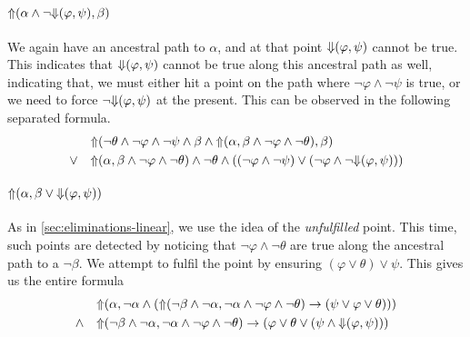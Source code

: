 \documentclass[a4paper,UKenglish,cleveref, autoref, thm-restate, numberwithinsect]{lipics-v2021}
\def\Uarrow{\ensuremath\mathord{\Uparrow}}
\def\Darrow{\ensuremath\mathord{\Downarrow}}
\begin{document}
\paragraph*{$\Uarrow(\alpha \land \lnot \Darrow(\varphi, \psi), \beta)$}

We again have an ancestral path to $\alpha$, and at that point $\Darrow(\varphi, \psi)$ cannot be true. This indicates that $\Darrow(\varphi, \psi)$ cannot be true along this ancestral path as well, indicating that, we must either hit a point on the path where $\lnot \varphi \land \lnot \psi$ is true, or we need to force $\lnot \Darrow(\varphi, \psi)$ at the present. This can be observed in the following separated formula.
\begin{equation*}
    \begin{aligned}
        &\Uarrow(\lnot \theta \land \lnot \varphi \land \lnot \psi \land \beta \land \Uarrow(\alpha, \beta \land \lnot \varphi \land \lnot \theta), \beta)\\
        \lor \quad &\Uarrow(\alpha, \beta \land \lnot \varphi \land \lnot \theta) \land \lnot \theta \land ((\lnot \varphi \land \lnot \psi) \lor (\lnot \varphi \land \lnot \Darrow(\varphi, \psi)))
    \end{aligned}
\end{equation*}

\paragraph*{$\Uarrow(\alpha, \beta \lor \Darrow(\varphi, \psi))$}

As in \cref{sec:eliminations-linear}, we use the idea of the \textit{unfulfilled} point. This time, such points are detected by noticing that $\lnot \varphi \land \lnot \theta$ are true along the ancestral path to a $\lnot \beta$. We attempt to fulfil the point by ensuring $(\varphi \lor \theta) \lor \psi$. This gives us the entire formula
\begin{equation*}
    \begin{aligned}
        &\Uarrow(\alpha, \lnot \alpha \land (\Uarrow(\lnot \beta \land \lnot \alpha, \lnot \alpha \land \lnot \varphi \land \lnot \theta) \to (\psi \lor \varphi \lor \theta)))\\
        \land \quad &\Uarrow(\lnot \beta \land \lnot \alpha, \lnot \alpha \land \lnot \varphi \land \lnot \theta) \to (\varphi \lor \theta \lor (\psi \land \Darrow(\varphi, \psi)))
    \end{aligned}
\end{equation*}
\end{document}
